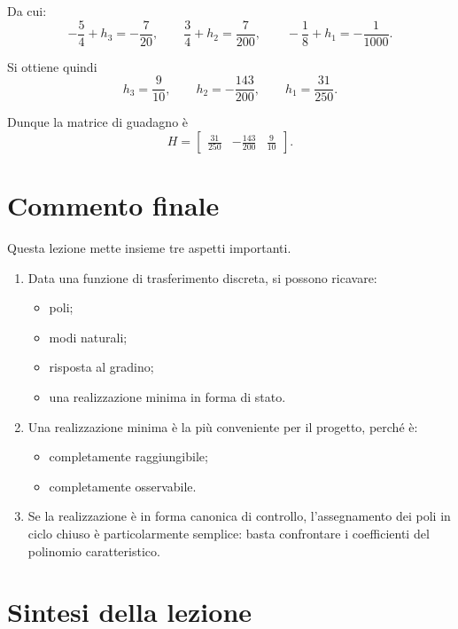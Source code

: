 Da cui:
\[
-\frac54+h_3=-\frac{7}{20},
\qquad
\frac34+h_2=\frac{7}{200},
\qquad
-\frac18+h_1=-\frac{1}{1000}.
\]

Si ottiene quindi
\[
h_3=\frac{9}{10},
\qquad
h_2=-\frac{143}{200},
\qquad
h_1=\frac{31}{250}.
\]

Dunque la matrice di guadagno è
\[
H=
\begin{bmatrix}
\frac{31}{250} & -\frac{143}{200} & \frac{9}{10}
\end{bmatrix}.
\]

\section{Commento finale}

Questa lezione mette insieme tre aspetti importanti.

\begin{enumerate}
    \item Data una funzione di trasferimento discreta, si possono ricavare:
    \begin{itemize}
        \item poli;
        \item modi naturali;
        \item risposta al gradino;
        \item una realizzazione minima in forma di stato.
    \end{itemize}

    \item Una realizzazione minima è la più conveniente per il progetto, perché è:
    \begin{itemize}
        \item completamente raggiungibile;
        \item completamente osservabile.
    \end{itemize}

    \item Se la realizzazione è in forma canonica di controllo, l'assegnamento dei poli in ciclo chiuso
    è particolarmente semplice: basta confrontare i coefficienti del polinomio caratteristico.
\end{enumerate}

\section{Sintesi della lezione}

